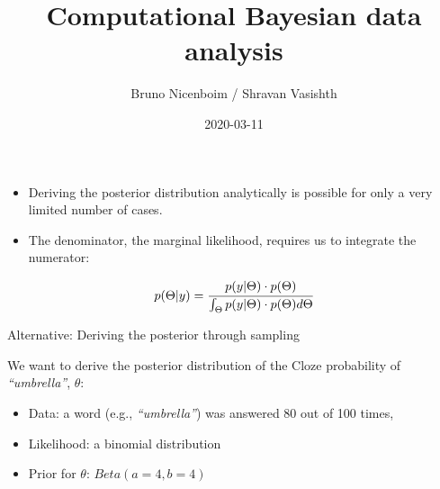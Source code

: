\documentclass[12pt,ignorenonframetext,aspectratio=169]{beamer}
\title{Computational Bayesian data analysis}
\author{Bruno Nicenboim / Shravan Vasishth}
\date{2020-03-11}
\providecommand{\tightlist}{%
  \setlength{\itemsep}{0pt}\setlength{\parskip}{0pt}}
\begin{document}
\frame{\titlepage}

\begin{frame}
\tableofcontents[hideallsubsections]
\end{frame}
\begin{frame}{}
\protect\hypertarget{section}{}

\begin{itemize}
\tightlist
\item
  Deriving the posterior distribution analytically is possible for only a very limited number of cases.
\item
  The denominator, the marginal likelihood, requires us to integrate the numerator:
\end{itemize}

\begin{equation}
p(\Theta|y) = \cfrac{ p(y|\Theta) \cdot p(\Theta) }{\int_{\Theta} p(y|\Theta) \cdot p(\Theta) d\Theta }
\end{equation}

\end{frame}

\begin{frame}{Alternative: Deriving the posterior through sampling}
\protect\hypertarget{alternative-deriving-the-posterior-through-sampling}{}

\small

\normalsize

\small

\normalsize

\small

\normalsize

\begin{block}{We want to derive the posterior distribution of the Cloze probability of \emph{``umbrella''}, \(\theta\):}

\begin{itemize}
\tightlist
\item
  Data: a word (e.g., \emph{``umbrella''}) was answered 80 out of 100 times,
\item
  Likelihood: a binomial distribution
\item
  Prior for \(\theta\): \(Beta(a=4,b=4)\)
\end{itemize}

\end{block}

\end{frame}
\end{document}
